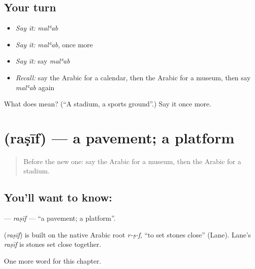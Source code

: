 \subsection*{Your turn}
\begin{itemize}
\raggedright
  \item \emph{Say it:} \emph{malʿab}
  \item \emph{Say it:} \emph{malʿab}, once more
  \item \emph{Say it:} say \emph{malʿab}
  \item \emph{Recall:} say the Arabic for a calendar, then the Arabic for a museum, then say \emph{malʿab} again
\end{itemize}

\begin{tcolorbox}[breakable,colback=teal!4,colframe=teal!35!black,title={Before you move on}]
What does  mean? (\textquotedblleft{}A stadium, a sports ground\textquotedblright{}.) Say it once more.
\end{tcolorbox}
\section[\texorpdfstring{\ar{رصيف} (raṣīf)}{رصيف (raṣīf)}]{ (raṣīf) — a pavement; a platform}

\label{lesson:AR-C235-rasif}



\begin{quote}
Before the new one: say the Arabic for a museum, then the Arabic for a stadium.
\end{quote}

\subsection*{You'll want to know: }
\textbf{} — \emph{raṣīf} — \textquotedblleft{}a pavement; a platform\textquotedblright{}.

\begin{cousinweb}
\textbf{} (\emph{raṣīf}) is built on the native Arabic root \emph{r-ṣ-f}, \textquotedblleft{}to set stones close\textquotedblright{} (Lane). Lane's \emph{raṣīf} is stones set close together.
\end{cousinweb}

\begin{grammarlens}[title={What you've built}]
One more word for this chapter.
\end{grammarlens}

